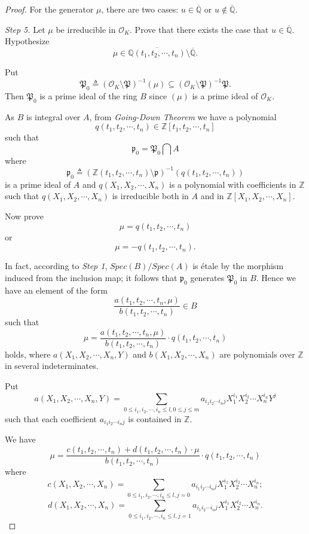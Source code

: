 \documentclass{amsart}
\theoremstyle{definition}
\numberwithin{equation}{section}
\begin{document}
\begin{proof}
For the generator $\mu$, there are two cases: $u\in \overline{\mathbb{Q}}$ or $u\not\in \overline{\mathbb{Q}}$.


\emph{Step 5.} Let $\mu$ be irreducible  in $\mathcal{O}_{K}$. Prove that there exists the case that $u\in \overline{\mathbb{Q}}.$
Hypothesize $$\mu\in \overline{\mathbb{Q}(t_{1},t_{2},\cdots,t_{n})}\setminus \overline{\mathbb{Q}}.$$

Put
$$
\mathfrak{P}_{0}\triangleq(\mathcal{O}_{K}\setminus \mathfrak{P})^{-1}(\mu)\subseteq (\mathcal{O}_{K}\setminus \mathfrak{P})^{-1}\mathfrak{P}.
$$
Then $\mathfrak{P}_{0}$ is a prime ideal
of the ring $B$ since $(\mu)$ is a prime ideal of $\mathcal{O}_{K}$.

As $B$ is integral over $A$, from \emph{Going-Down Theorem} we have a polynomial
$$q(t_{1},t_{2},\cdots,t_{n})\in \mathbb{Z}[t_{1},t_{2},\cdots,t_{n}]$$
such that $$\mathfrak{p}_{0}=\mathfrak{P}_{0}\bigcap A$$
where $$\mathfrak{p}_{0}\triangleq(\mathbb{Z}(t_{1},t_{2},\cdots,t_{n})\setminus \mathfrak{p})^{-1}(q(t_{1},t_{2},\cdots,t_{n}))$$
is a prime ideal of $A$ and $q(X_{1},X_{2},\cdots,X_{n})$ is a polynomial with coefficients in $\mathbb{Z}$ such that $q(X_{1},X_{2},\cdots,X_{n})$ is irreducible both in $A$ and in $\mathbb{Z}[X_{1},X_{2},\cdots,X_{n}]$.

Now prove $$\mu=q(t_{1},t_{2},\cdots,t_{n})$$ or $$\mu=-q(t_{1},t_{2},\cdots,t_{n}).$$


In fact, according to \emph{Step 1}, $Spec(B)/Spec(A)$ is \'{e}tale by the
morphism induced from the inclusion map; it follows that $\mathfrak{p}_{0}$ generates $\mathfrak{P}_{0}$ in $B$. Hence we have an element of the form $$\frac{a(t_{1},t_{2},\cdots,t_{n},\mu)}{b(t_{1},t_{2},\cdots,t_{n})}\in B$$ such that
\begin{equation*}
\mu
=\frac{a(t_{1},t_{2},\cdots,t_{n},\mu)}{b(t_{1},t_{2},\cdots,t_{n})}\cdot q(t_{1},t_{2},\cdots,t_{n})
\end{equation*}
holds, where  $a(X_{1},X_{2},\cdots,X_{n},Y)$ and $b(X_{1},X_{2},\cdots,X_{n})$ are polynomials over $\mathbb{Z}$ in several indeterminates.


Put
\begin{equation*}
a(X_{1},X_{2},\cdots,X_{n},Y)=\sum _{0\leq i_{1},i_{2},\cdots, i_{n}\leq l, 0\leq j\leq m}a_{i_{1}i_{2}\cdots i_{n}j}X_{1}^{i_{1}}X_{2}^{i_{2}}\cdots X_{n}^{i_{n}}Y^{j}
\end{equation*}
such that each coefficient $a_{i_{1}i_{2}\cdots i_{n}j}$ is contained in $ \mathbb{Z}$.

We have
$$\mu
=\frac{c(t_{1},t_{2},\cdots,t_{n})+d(t_{1},t_{2},\cdots,t_{n})\cdot\mu}{b(t_{1},t_{2},\cdots,t_{n})}\cdot q(t_{1},t_{2},\cdots,t_{n})$$
where
$$c(X_{1},X_{2},\cdots,X_{n})=\sum _{0\leq i_{1},i_{2},\cdots, i_{n}\leq l,  j=0}a_{i_{1}i_{2}\cdots i_{n}j}X_{1}^{i_{1}}X_{2}^{i_{2}}\cdots X_{n}^{i_{n}};$$
$$d(X_{1},X_{2},\cdots,X_{n})=\sum _{0\leq i_{1},i_{2},\cdots, i_{n}\leq l,  j=1}a_{i_{1}i_{2}\cdots i_{n}j}X_{1}^{i_{1}}X_{2}^{i_{2}}\cdots X_{n}^{i_{n}}.$$


\end{proof}
\end{document}
